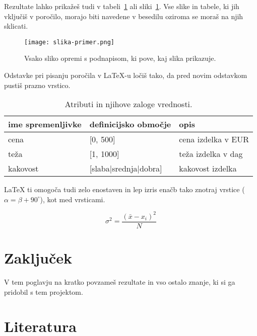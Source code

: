 \documentclass[a4paper,11pt]{article}
\begin{document}
Rezultate lahko prikažeš tudi v tabeli~\ref{tab1} ali sliki~\ref{slika1}.
Vse slike in tabele, ki jih vključiš v poročilo, morajo biti navedene v
besedilu oziroma se moraš na njih sklicati.

\begin{figure}[htbp]
      \begin{center}
            \texttt{[image: slika-primer.png]} %
            \caption{Vsako sliko opremi s podnapisom, ki pove, kaj slika prikazuje.}
            \label{slika1}
      \end{center}
\end{figure}

Odstavke pri pisanju poročila v LaTeX-u ločiš tako, da pred novim
odstavkom pustiš prazno vrstico.
\begin{table}[htbp]
      \caption{Atributi in njihove zaloge vrednosti.}
      \label{tab1}
      \begin{center}
            \begin{tabular}{llp{3cm}}
                  \hline
                  ime spremenljivke & definicijsko območje  & opis               \\
                  \hline
                  cena              & [0, 500]              & cena izdelka v EUR \\
                  teža              & [1, 1000]             & teža izdelka v dag \\
                  kakovost          & [slaba|srednja|dobra] & kakovost izdelka   \\
                  \hline
            \end{tabular}
      \end{center}
\end{table}

LaTeX ti omogoča tudi zelo enostaven in lep izris enačb tako znotraj vrstice
($\alpha = \beta + 90^{\circ}$), kot med vrsticami.

$$\sigma^2 = \frac{(\bar{x} - x_i)^2}{N}$$

\section{Zaključek}

V tem poglavju na kratko povzameš rezultate in vso ostalo znanje, ki si ga pridobil
s tem projektom.

\section{Literatura}
\end{document}
